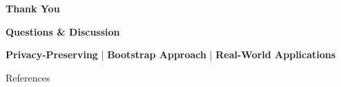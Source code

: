 \documentclass[aspectratio=169,xcolor={dvipsnames}]{beamer}
\begin{document}
\begin{frame}[plain]
  \centering
  \Huge \textbf{Thank You}
  
  \vspace{0.5em}
  \Large \textbf{Questions \& Discussion}
  
  \vspace{2em}
  \begin{block}{}
    \centering
    \textbf{Privacy-Preserving} | \textbf{Bootstrap Approach} | \textbf{Real-World Applications}
  \end{block}
\end{frame}

\begin{frame}[allowframebreaks]{References}
  \footnotesize
  \printbibliography[heading=none]
\end{frame}
\end{document}

